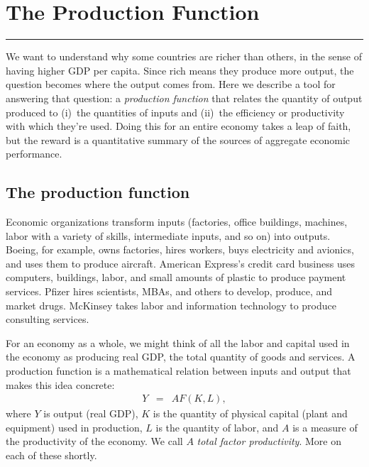 \chapter{The Production Function}\label{chp:agpf}
\hypertarget{production}{}


\rule{\textwidth}{1pt}

We want to understand why some countries are richer than others,
in the sense of having higher GDP per capita.
Since rich means they produce more output,
the question becomes where the output comes from.
Here we describe a tool for answering that question:
a {\it production function\/} that relates the quantity of output produced to
(i)~the quantities of inputs and (ii)~the efficiency or productivity
with which they're used.
Doing this for an entire economy takes a leap of faith,
but the reward is a quantitative summary of the sources of
aggregate economic performance.


\section{The production function }
\label{sec:production_function}

Economic organizations transform inputs (factories, office
buildings, machines, labor with a variety of skills, intermediate
inputs, and so on) into outputs.  Boeing, for example,
owns factories, hires workers, buys electricity and avionics, and
uses them to produce aircraft. American Express's credit card
business uses computers, buildings, labor, and small amounts of
plastic to produce payment services. Pfizer hires scientists,
MBAs, and others to develop, produce, and market drugs. McKinsey
takes labor and information technology to produce consulting
services.


For an economy as a whole, we might think of all the labor and capital
used in the economy as producing real GDP,
the total quantity of goods and services.
A production function is a mathematical relation between inputs and output
that makes this idea concrete:
\begin{eqnarray*}
    Y &=& A F(K,L) ,
    \label{eq:pf-general}
\end{eqnarray*}
where $Y$ is output (real GDP), $K$ is the quantity of physical capital  
(plant and equipment) used in production,
$L$ is the quantity of labor,
and $A$ is a measure of the productivity of the economy. We call $A$ \emph{total factor productivity}.
More on each of these shortly.


